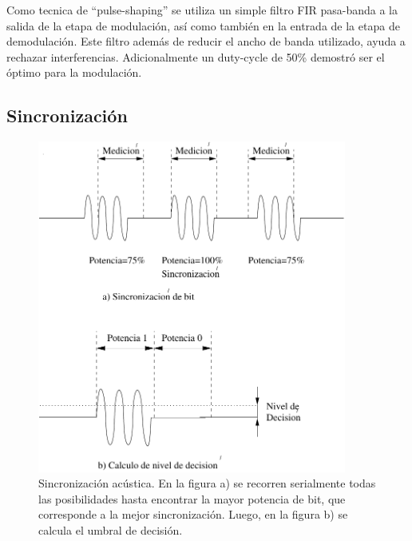 Como tecnica de ``pulse-shaping'' se utiliza un simple filtro FIR pasa-banda a la salida de la etapa de modulación, así como también en la entrada de la etapa de demodulación. Este filtro además de reducir el ancho de banda utilizado, ayuda a rechazar interferencias.
Adicionalmente un duty-cycle de 50\% demostró ser el óptimo para la modulación.

\subsection{Sincronización}

\begin{figure}[t]
  \centering
    \includegraphics[width=4in]{graphs/acusync.pdf}
\caption {Sincronización acústica. En la figura a) se recorren serialmente todas las posibilidades hasta encontrar la mayor potencia de bit, que corresponde a la mejor sincronización. Luego, en la figura b) se calcula el umbral de decisión.}
\label{fig:acusync}
\end{figure}

